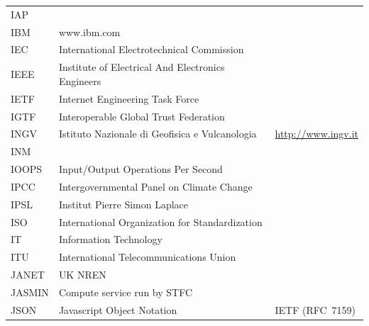 \documentclass{../../template/esiwace-report}
\begin{document}
\begin{longtable}{|l|l|l|}
  IAP         &                                                       &                                       \\
  IBM         &       www.ibm.com                                     &                                       \\
  IEC         &         International Electrotechnical Commission     &                                       \\
  IEEE	      &	Institute of Electrical And Electronics Engineers	&					\\
  IETF        &       Internet Engineering Task Force                 &                                       \\
  IGTF        &       Interoperable Global Trust Federation           &                                       \\
  INGV        &         Istituto Nazionale di Geofisica e Vulcanologia&         \url{http://www.ingv.it}                   \\
  INM         &                                                       &                                       \\
  IOOPS       &       Input/Output Operations Per Second              &                                       \\
  IPCC        &         Intergovernmental Panel on Climate Change     &                                       \\
  IPSL        &         Institut Pierre Simon Laplace                 &                                       \\
  ISO         &         International Organization for Standardization&                                       \\
  IT          &       Information Technology                          &                                       \\
  ITU         &       International Telecommunications Union          &                                       \\
  JANET       &       UK NREN                                         &                                       \\
  JASMIN      &       Compute service run by STFC                     &                                       \\
  JSON        &         Javascript Object Notation                    &         IETF (RFC~7159)               \\

\end{longtable}
\end{document}
